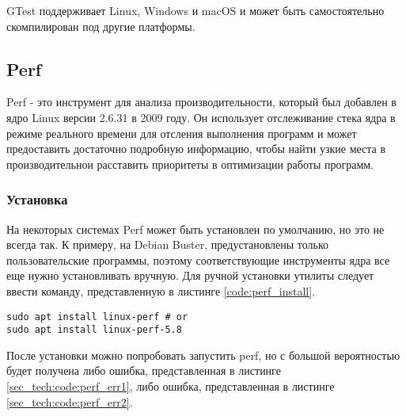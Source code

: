 GTest поддерживает Linux, Windows и macOS и может быть самостоятельно скомпилирован под другие платформы.

\subsection{Perf}

Perf - это инструмент для анализа производительности, который был добавлен в ядро Linux версии 2.6.31 в 2009 году.
Он использует отслеживание стека ядра в режиме реального времени для отсления выполнения программ и может предоставить 
достаточно подробную информацию, чтобы найти узкие места в производительнои расставить приоритеты в оптимизации работы программ.

\subsubsection{Установка} 

На некоторых системах Perf может быть установлен по умолчанию, но это не всегда так.
К примеру, на Debian Buster, предустановлены только пользовательские программы, поэтому соответствующие инструменты ядра все еще нужно установливать вручную.
Для ручной установки утилиты следует ввести команду, представленную в листинге \ref{code:perf_install}.

\begin{lstlisting}[style=CodeListing, caption={Установка утилиты perf в ОС Linux}, label=code:perf_install]
sudo apt install linux-perf # or
sudo apt install linux-perf-5.8
\end{lstlisting}

После установки можно попробовать запустить perf, но с большой вероятностью будет получена либо ошибка, представленная в листинге \ref{sec_tech:code:perf_err1}, либо ошибка, представленная в листинге \ref{sec_tech:code:perf_err2}.

